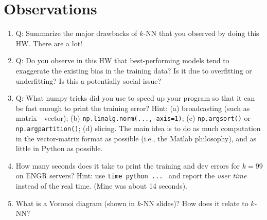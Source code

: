 \documentclass[11pt]{article}
\begin{document}
\section{Observations}
\label{sec:obs}
\begin{enumerate}
\item
Q: Summarize the major drawbacks of $k$-NN that you observed by doing this HW. There are a lot!

\item
Q: Do you observe in this HW that best-performing models tend to exaggerate the existing bias in the training data? Is it due to overfitting or underfitting? Is this a potentially social issue?

\item \label{list:numpy}
Q: What numpy tricks did you use to speed up your program so that it can be fast enough to print the training error?  Hint: (a) broadcasting (such as matrix - vector);
(b) \verb|np.linalg.norm(..., axis=1)|;
 (c) \verb|np.argsort()| or \verb|np.argpartition()|; (d) slicing.
 The main idea is to do as much computation in the vector-matrix format as possible 
 (i.e., the Matlab philosophy),
 and as little in Python as possible.
 
 \item
 
 How many seconds does it take to print the training and dev errors for $k=99$ on ENGR servers?
 Hint: use \verb|time python ... | and report the {\em user time} instead of the real time. (Mine was about 14 seconds).

\item

What is a Voronoi diagram (shown in $k$-NN slides)? How does it relate to $k$-NN?

\end{enumerate}



%
%
%
%
%
%
%
\end{document}
